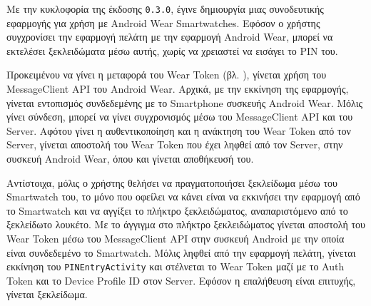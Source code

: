 Με την κυκλοφορία της έκδοσης \verb|0.3.0|, έγινε δημιουργία μιας συνοδευτικής εφαρμογής για χρήση με Android Wear Smartwatches. Εφόσον ο χρήστης συγχρονίσει την εφαρμογή πελάτη με την εφαρμογή Android Wear, μπορεί να εκτελέσει ξεκλειδώματα μέσω αυτής, χωρίς να χρειαστεί να εισάγει το PIN του. 

Προκειμένου να γίνει η μεταφορά του Wear Token (βλ. ), γίνεται χρήση του MessageClient API του Android Wear. Αρχικά, με την εκκίνηση της εφαρμογής, γίνεται εντοπισμός συνδεδεμένης με το Smartphone συσκευής Android Wear. Μόλις γίνει σύνδεση, μπορεί να γίνει συγχρονισμός μέσω του MessageClient API και του Server. Αφότου γίνει η αυθεντικοποίηση και η ανάκτηση του Wear Token από τον Server, γίνεται αποστολή του Wear Token που έχει ληφθεί από τον Server, στην συσκευή Android Wear, όπου και γίνεται αποθήκευσή του.

Αντίστοιχα, μόλις ο χρήστης θελήσει να πραγματοποιήσει ξεκλείδωμα μέσω του Smartwatch του, το μόνο που οφείλει να κάνει είναι να εκκινήσει την εφαρμογή από το Smartwatch και να αγγίξει το πλήκτρο ξεκλειδώματος, αναπαριστόμενο από το ξεκλείδωτο λουκέτο. Με το άγγιγμα στο πλήκτρο ξεκλειδώματος γίνεται αποστολή του Wear Token μέσω του MessageClient API στην συσκευή Android με την οποία είναι συνδεδεμένο το Smartwatch. Μόλις ληφθεί από την εφαρμογή πελάτη, γίνεται εκκίνηση του \verb|PINEntryActivity| και στέλνεται το Wear Token μαζί με το Auth Token και το Device Profile ID στον Server. Εφόσον η επαλήθευση είναι επιτυχής, γίνεται ξεκλείδωμα.